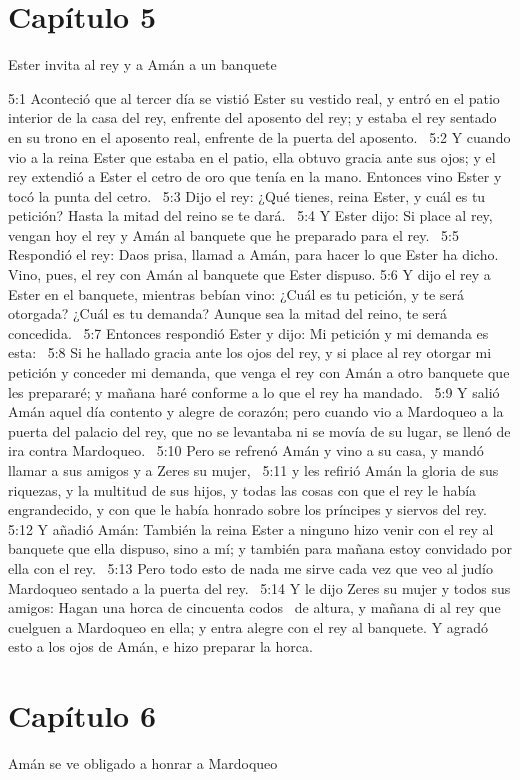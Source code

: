 \section*{Capítulo 5}
Ester invita al rey y a Amán a un banquete  

5:1 Aconteció que al tercer día se vistió Ester su vestido real, y entró en el patio interior de la casa del rey, enfrente del aposento del rey; y estaba el rey sentado en su trono en el aposento real, enfrente de la puerta del aposento.  
5:2 Y cuando vio a la reina Ester que estaba en el patio, ella obtuvo gracia ante sus ojos; y el rey extendió a Ester el cetro de oro que tenía en la mano. Entonces vino Ester y tocó la punta del cetro.  
5:3 Dijo el rey: ¿Qué tienes, reina Ester, y cuál es tu petición? Hasta la mitad del reino se te dará.  
5:4 Y Ester dijo: Si place al rey, vengan hoy el rey y Amán al banquete que he preparado para el rey.  
5:5 Respondió el rey: Daos prisa, llamad a Amán, para hacer lo que Ester ha dicho. Vino, pues, el rey con Amán al banquete que Ester dispuso. 
5:6 Y dijo el rey a Ester en el banquete, mientras bebían vino: ¿Cuál es tu petición, y te será otorgada? ¿Cuál es tu demanda? Aunque sea la mitad del reino, te será concedida.  
5:7 Entonces respondió Ester y dijo: Mi petición y mi demanda es esta:  
5:8 Si he hallado gracia ante los ojos del rey, y si place al rey otorgar mi petición y conceder mi demanda, que venga el rey con Amán a otro banquete que les prepararé; y mañana haré conforme a lo que el rey ha mandado.  
5:9 Y salió Amán aquel día contento y alegre de corazón; pero cuando vio a Mardoqueo a la puerta del palacio del rey, que no se levantaba ni se movía de su lugar, se llenó de ira contra Mardoqueo.  
5:10 Pero se refrenó Amán y vino a su casa, y mandó llamar a sus amigos y a Zeres su mujer,  
5:11 y les refirió Amán la gloria de sus riquezas, y la multitud de sus hijos, y todas las cosas con que el rey le había engrandecido, y con que le había honrado sobre los príncipes y siervos del rey.  
5:12 Y añadió Amán: También la reina Ester a ninguno hizo venir con el rey al banquete que ella dispuso, sino a mí; y también para mañana estoy convidado por ella con el rey.  
5:13 Pero todo esto de nada me sirve cada vez que veo al judío Mardoqueo sentado a la puerta del rey.  
5:14 Y le dijo Zeres su mujer y todos sus amigos: Hagan una horca de cincuenta codos  de altura, y mañana di al rey que cuelguen a Mardoqueo en ella; y entra alegre con el rey al banquete. Y agradó esto a los ojos de Amán, e hizo preparar la horca.  
\section*{Capítulo 6 }
Amán se ve obligado a honrar a Mardoqueo  

